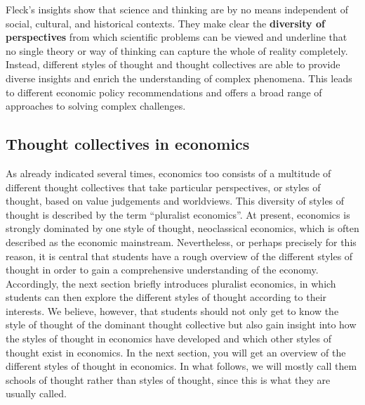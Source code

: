 \documentclass[
  british,
  a4paper,
  DIV=11,
  numbers=noendperiod,
  oneside,
  openany]{scrreprt}
\begin{document}
Fleck's insights show that science and thinking are by no means
independent of social, cultural, and historical contexts. They make
clear the \textbf{diversity of perspectives} from which scientific
problems can be viewed and underline that no single theory or way of
thinking can capture the whole of reality completely. Instead, different
styles of thought and thought collectives are able to provide diverse
insights and enrich the understanding of complex phenomena. This leads
to different economic policy recommendations and offers a broad range of
approaches to solving complex challenges.

\subsection{Thought collectives in
economics}\label{thought-collectives-in-economics}

As already indicated several times, economics too consists of a
multitude of different thought collectives that take particular
perspectives, or styles of thought, based on value judgements and
worldviews. This diversity of styles of thought is described by the term
``pluralist economics''. At present, economics is strongly dominated by
one style of thought, neoclassical economics, which is often described
as the economic mainstream. Nevertheless, or perhaps precisely for this
reason, it is central that students have a rough overview of the
different styles of thought in order to gain a comprehensive
understanding of the economy. Accordingly, the next section briefly
introduces pluralist economics, in which students can then explore the
different styles of thought according to their interests. We believe,
however, that students should not only get to know the style of thought
of the dominant thought collective but also gain insight into how the
styles of thought in economics have developed and which other styles of
thought exist in economics. In the next section, you will get an
overview of the different styles of thought in economics. In what
follows, we will mostly call them schools of thought rather than styles
of thought, since this is what they are usually called.
\end{document}
